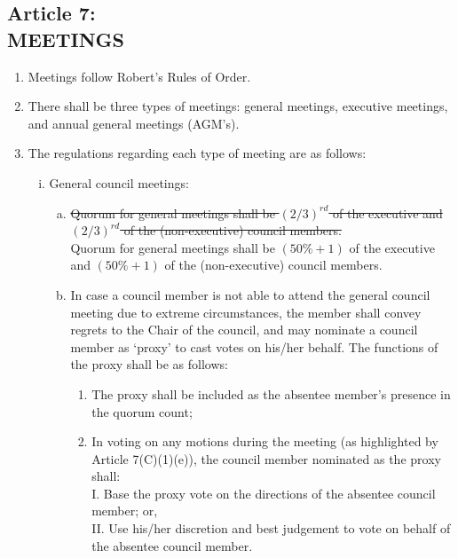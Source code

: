 \documentclass[]{report}
\begin{document}
\clearpage
\begin{center}
	\section*{Article 7:\\MEETINGS}
	\vspace{12px}
\end{center}
\label{meetings}
	\renewcommand{\theenumi}{\Alph{enumi}}
	\begin{enumerate}
		
		\item Meetings follow Robert's Rules of Order.
		\item There shall be three types of meetings: general meetings, executive meetings, and annual general meetings (AGM’s).
		\item The regulations regarding each type of meeting are as follows:
			\begin{enumerate}[i.]
				\item General council meetings:
					\begin{enumerate}[(a)]
						\item \st{Quorum for general meetings shall be $ (2/3) ^{rd}$ of the executive and $ (2/3) ^{rd}$ of the (non-executive) council members.}\color{red}\\
						Quorum for general meetings shall be $ (50\% + 1) $ of the executive and $ (50\% + 1) $ of the (non-executive) council members.
						\item In case a council member is not able to attend the general council meeting due to extreme circumstances, the member shall convey regrets to the Chair of the council, and may nominate a council member as `proxy' to cast votes on his/her behalf. The functions of the proxy shall be as follows:
							\begin{enumerate}[(1)]
								\item The proxy shall be included as the absentee member's presence in the quorum count; 
								\item In voting on any motions during the meeting (as highlighted by Article 7(C)(1)(e)), the council member nominated as the proxy shall:\\
									  I. \space Base the proxy vote on the directions of the absentee council member; or,\\
									  II. Use his/her discretion and best judgement to vote on behalf of the absentee council member.
							\end{enumerate}

\end{enumerate}
\end{enumerate}
\end{enumerate}
\end{document}
